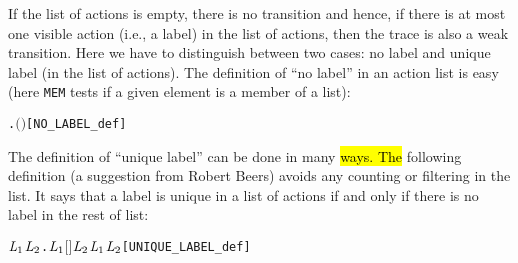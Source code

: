 If the list of actions is empty,  there is no transition and hence,
if there is at most one visible action (i.e., a label) in the list of actions,
then the trace is also a weak transition. Here
we have to distinguish between two cases: no label and unique label (in
the list of actions). The definition of ``no
label'' in an action list is easy (here \texttt{MEM} tests if a given element is a member of a list):
\begin{alltt}
     \HOLTokenDefEquality{} \HOLSymConst{\HOLTokenNeg{}}\HOLSymConst{\HOLTokenExists{}}.  \ensuremath{(} \ensuremath{)} \hfill{[NO_LABEL_def]}
\end{alltt}

The definition of ``unique label'' can be done in many \hl{ways. The}
following definition (a suggestion from Robert Beers)
avoids any counting or filtering in the list.
It says that a label is unique in a list of actions if and only if there is no
label in the rest of list:
\begin{alltt}
      \HOLTokenDefEquality{}
     \HOLSymConst{\HOLTokenExists{}}\ensuremath{\HOLBoundVar{L}\sb{\mathrm{1}}} \ensuremath{\HOLBoundVar{L}\sb{\mathrm{2}}}. \ensuremath{\HOLBoundVar{L}\sb{\mathrm{1}}} \HOLSymConst{\HOLTokenDoublePlus} \ensuremath{[}\ensuremath{]} \HOLSymConst{\HOLTokenDoublePlus} \ensuremath{\HOLBoundVar{L}\sb{\mathrm{2}}} \HOLSymConst{\ensuremath{=}}  \HOLSymConst{\HOLTokenConj{}}  \ensuremath{\HOLBoundVar{L}\sb{\mathrm{1}}} \HOLSymConst{\HOLTokenConj{}}  \ensuremath{\HOLBoundVar{L}\sb{\mathrm{2}}}\hfill{[UNIQUE_LABEL_def]}
\end{alltt}

